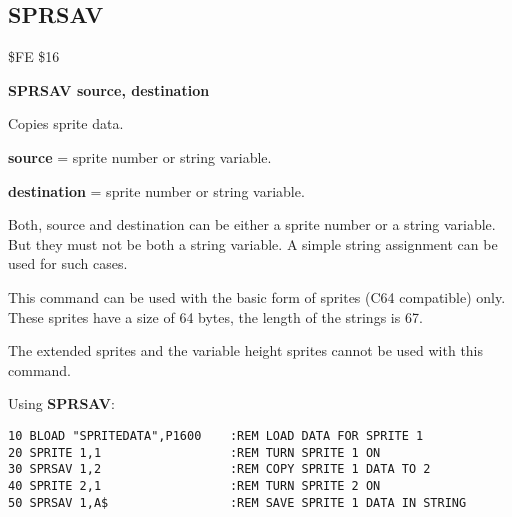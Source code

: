 
\newpage
\subsection{SPRSAV}
\begin{description}[leftmargin=2cm,style=nextline]
\item [Token:] \$FE \$16
\item [Format:] {\bf SPRSAV source, destination}
\item [Usage:]  Copies sprite data.

                {\bf source} = sprite number or string variable.

                {\bf destination} = sprite number or string variable.

\item [Remarks:] Both, source and destination can be either
                a sprite number or a string variable.
                But they must not be both a string variable.
                A simple string assignment can be used for such
                cases.

                This command can be used with the basic form of sprites
                (C64 compatible) only. These sprites have a size of 64 bytes,
                the length of the strings is 67.

                The extended sprites and the variable height sprites
                cannot be used with this command.

\item [Example:] Using {\bf SPRSAV}:
\begin{tcolorbox}[colback=black,coltext=white]
\verbatimfont{\codefont}
\begin{verbatim}
10 BLOAD "SPRITEDATA",P1600    :REM LOAD DATA FOR SPRITE 1
20 SPRITE 1,1                  :REM TURN SPRITE 1 ON
30 SPRSAV 1,2                  :REM COPY SPRITE 1 DATA TO 2
40 SPRITE 2,1                  :REM TURN SPRITE 2 ON
50 SPRSAV 1,A$                 :REM SAVE SPRITE 1 DATA IN STRING
\end{verbatim}
\end{tcolorbox}
\end{description}


\newpage
